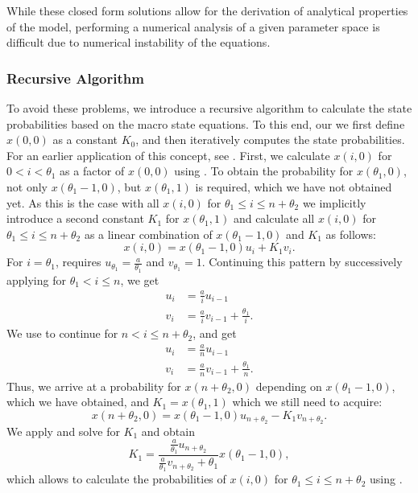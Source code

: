 While these closed form solutions allow for the derivation of analytical properties of the model, performing a numerical analysis of a given parameter space is difficult due to numerical instability of the equations.

\subsubsection*{Recursive Algorithm}
To avoid these problems, we introduce a recursive algorithm to calculate the state probabilities based on the macro state equations.
To this end, our we first define \(x(0,0)\) as a constant \(K_0\), and then iteratively computes the state probabilities.
For an earlier application of this concept, see \cite{Trangia1997}.
First, we calculate \(x(i,0)\) for \(0<i<\theta_1\) as a factor of \(x(0,0)\) using .
To obtain the probability for \(x(\theta_1,0)\), not only \(x(\theta_1 -1, 0)\), but \(x(\theta_1, 1)\) is required, which we have not obtained yet.
As this is the case with all \(x(i,0)\) for \(\theta_1 \leq i \leq n + \theta_2\) we implicitly introduce a second constant \(K_1\) for \(x(\theta_1, 1)\) and calculate all \(x(i,0)\) for \(\theta_1 \leq i \leq n + \theta_2\) as a linear combination of \(x(\theta_1 - 1,0)\) and \(K_1\) as follows:
\begin{equation}
x(i, 0) = x(\theta_1 - 1, 0) u_i + K_1 v_i.\label{eq:cloud:data_centers:modeling:closed_form_solution:linear_combination}
\end{equation}
For \(i = \theta_1\),  requires \(u_{\theta_1} = \frac{a}{\theta_1}\) and \(v_{\theta_1} = 1\).
Continuing this pattern by successively applying  for \(\theta_1 < i \leq n\), we get
\begin{align*}
u_i &= \frac{a}{i}u_{i-1}\\
v_i &= \frac{a}{i}v_{i-1} + \frac{\theta_1}{i}.
\end{align*}
We use  to continue for \(n < i \leq n + \theta_2\), and get
\begin{align*}
u_i &= \frac{a}{n}u_{i-1}\\
v_i &= \frac{a}{n}v_{i-1} + \frac{\theta_1}{n}.
\end{align*}
Thus, we arrive at a probability for \(x(n + \theta_2,0)\) depending on \(x(\theta_1 -1,0)\), which we have obtained, and \(K_1 = x(\theta_1,1)\) which we still need to acquire:
\begin{equation*}
x(n+\theta_2,0) = x(\theta_1 -1,0) u_{n+\theta_2} - K_1 v_{n+\theta_2}.
\end{equation*}
We apply  and solve for \(K_1\) and obtain
\begin{equation*}
K_1 =  \frac{\frac{a}{\theta_1} u_{n+\theta_2}}{\frac{a}{\theta_1} v_{n + \theta_2} + \theta_1} x(\theta_1 - 1, 0),
\end{equation*}
which allows to calculate the probabilities of \(x(i,0)\) for \(\theta_1 \leq i \leq n + \theta_2\) using .

